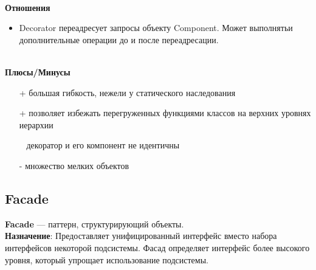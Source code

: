 \documentclass[a3paper,11pt]{report}
\begin{document}
\textbf{\\Отношения}
\begin{itemize}
\item Decorator переадресует запросы объекту Component. Может выполнятьи дополнительные операции до и после переадресации.
\end{itemize}

\textbf{\\Плюсы/Минусы}
\begin{itemize}
\item [+] большая гибкость, нежели у статического наследования
\item [+] позволяет избежать перегруженных функциями классов на верхних уровнях иерархии
\item [~] декоратор и его компонент не идентичны
\item [-] множество мелких объектов
\end{itemize}
\newpage
\subsection{Facade}

\large\textbf{Facade} --- паттерн, структурирующий объекты.
\\
\large\textbf{Назначение}: Предоставляет унифицированный интерфейс вместо набора интерфейсов некоторой подсистемы. Фасад определяет интерфейс более высокого уровня, который упрощает использование подсистемы.
\\
\end{document}
